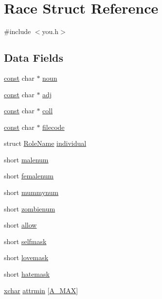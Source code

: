 \hypertarget{structRace}{\section{Race Struct Reference}
\label{structRace}
}


{\ttfamily \#include $<$you.\+h$>$}

\subsection*{Data Fields}
\begin{DoxyCompactItemize}
\item 
\hyperlink{tradstdc_8h_a2c212835823e3c54a8ab6d95c652660e}{const} char $\ast$ \hyperlink{structRace_a5a94ed91d36f9a470a6bb7c5b28dd8a2}{noun}
\item 
\hyperlink{tradstdc_8h_a2c212835823e3c54a8ab6d95c652660e}{const} char $\ast$ \hyperlink{structRace_a61ff8fd4db65f11000381aa0dff23e55}{adj}
\item 
\hyperlink{tradstdc_8h_a2c212835823e3c54a8ab6d95c652660e}{const} char $\ast$ \hyperlink{structRace_afab22eb91fe31c13e36fc36fea26b64b}{coll}
\item 
\hyperlink{tradstdc_8h_a2c212835823e3c54a8ab6d95c652660e}{const} char $\ast$ \hyperlink{structRace_a897f9034ff9163ef0ebcc9ebee43e3c3}{filecode}
\item 
struct \hyperlink{structRoleName}{Role\+Name} \hyperlink{structRace_ad212db19e838175368f11ba7ee28aa68}{individual}
\item 
short \hyperlink{structRace_a6dc454d6faae86cdc46c9a4f53f3f132}{malenum}
\item 
short \hyperlink{structRace_aa3c74c68c2bc4f8d1e63d76d5c3b217d}{femalenum}
\item 
short \hyperlink{structRace_aa3c20e0a53e012337991e56581ce29c5}{mummynum}
\item 
short \hyperlink{structRace_a1b6fce11cbd5ac450b0f28e1c28e9c82}{zombienum}
\item 
short \hyperlink{structRace_ab83e1168110644aaec0af3651a2bad12}{allow}
\item 
short \hyperlink{structRace_a18016193be7875cc535f72383934d977}{selfmask}
\item 
short \hyperlink{structRace_a4cec9b3b279a607c1d1e4beb13c1109c}{lovemask}
\item 
short \hyperlink{structRace_abd24782a32cd0c7fab40ba97dce945f4}{hatemask}
\item 
\hyperlink{global_8h_a2043b7d01ce89f4ee2fa6c345a752d32}{xchar} \hyperlink{structRace_a65622998e211c5ee7fdb1f6e913b089b}{attrmin} \mbox{[}\hyperlink{attrib_8h_a8f8289cfc29e0bb2a2626262bfeedf21}{A\+\_\+\+M\+A\+X}\mbox{]}

\end{DoxyCompactItemize}
